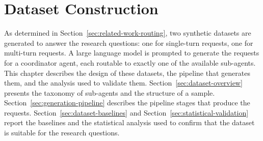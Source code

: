 \chapter{Dataset Construction}
\label{chap:dataset-construction}

As determined in Section~\ref{sec:related-work-routing}, two synthetic datasets are generated to answer the research questions: one for single-turn requests, one for multi-turn requests. A large language model is prompted to generate the requests for a coordinator agent, each routable to exactly one of the available sub-agents. This chapter describes the design of these datasets, the pipeline that generates them, and the analysis used to validate them. Section~\ref{sec:dataset-overview} presents the taxonomy of sub-agents and the structure of a sample. Section~\ref{sec:generation-pipeline} describes the pipeline stages that produce the requests. Section~\ref{sec:dataset-baselines} and Section~\ref{sec:statistical-validation} report the baselines and the statistical analysis used to confirm that the dataset is suitable for the research questions.








